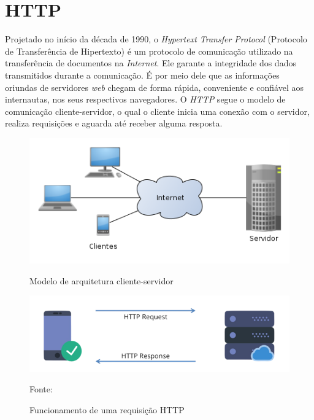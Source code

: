 \section{HTTP}

Projetado no início da década de 1990, o \textit{Hypertext Transfer Protocol} (Protocolo de Transferência de Hipertexto) é um protocolo de comunicação utilizado na transferência de documentos na \textit{Internet}. Ele garante a integridade dos dados transmitidos durante a comunicação. É por meio dele que as informações oriundas de servidores \textit{web} chegam de forma rápida, conveniente e confiável aos internautas, nos seus respectivos navegadores. O \textit{HTTP} segue o modelo de comunicação cliente-servidor, o qual o cliente inicia uma conexão com o servidor, realiza requisições e aguarda até receber alguma resposta.

\begin{figure}[h]
	\centering
	\includegraphics[width=\textwidth]{imagens/modelo-arquitetura-cliente-servidor.png}
	\caption{Modelo de arquitetura cliente-servidor}
	\cite{ClienteServidorWikipedia}
	\label{fig:modelo-arquitetura-cliente-servidor}
\end{figure}

\begin{figure}[h]
	\centering
	\includegraphics[width=\textwidth]{imagens/requisicao-http.png}
	\caption{Funcionamento de uma requisição HTTP}
	Fonte: \cite{HttpRequest}
	\label{fig:requisicao-http}
\end{figure}

